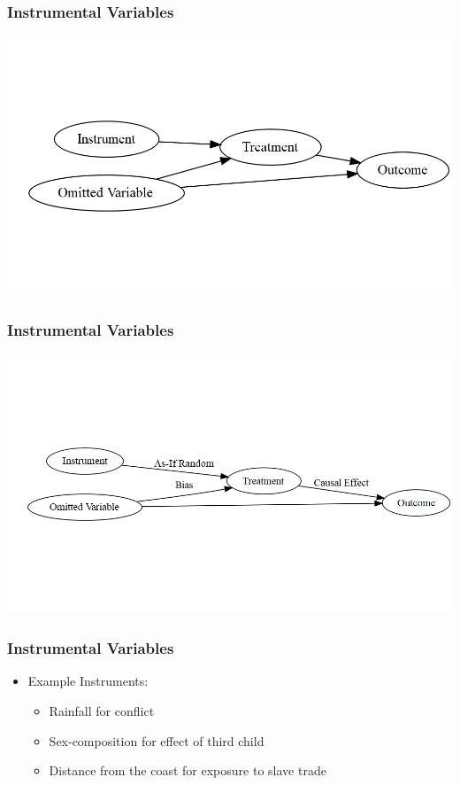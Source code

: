 \documentclass[xcolor=x11names,compress]{beamer}\usepackage[]{graphicx}\usepackage[]{color}
\makeatletter
\def\maxwidth{ %
  \ifdim\Gin@nat@width>\linewidth
    \linewidth
  \else
    \Gin@nat@width
  \fi
}
\newenvironment{knitrout}{}{} %
\renewcommand{\(}{\begin{columns}}
\renewcommand{\)}{\end{columns}}
\newcommand{\<}[1]{\begin{column}{#1}}
\renewcommand{\>}{\end{column}}
\makeatother
\begin{document}
\begin{frame}
\frametitle{Instrumental Variables}
\begin{knitrout}
\color{fgcolor}
\includegraphics[width=\maxwidth]{figure/dag2-1} 

\end{knitrout}
\end{frame}

\begin{frame}
\frametitle{Instrumental Variables}
\begin{knitrout}
\color{fgcolor}
\includegraphics[width=\maxwidth]{figure/dag3-1} 

\end{knitrout}
\end{frame}


\begin{frame}
\frametitle{Instrumental Variables}
\begin{itemize}
\item Example Instruments:
\begin{itemize}
\item Rainfall for conflict 
\item Sex-composition for effect of third child
\item Distance from the coast for exposure to slave trade
\end{itemize}
\end{itemize}
\end{frame}
\end{document}

